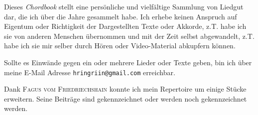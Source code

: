 \documentclass[landscape]{../TeX/Chordbook/chordbook}
\newcommand{\blankpage}{%
    \null
    \thispagestyle{empty}%
    \addtocounter{page}{-1}%
    \newpage}
\newcommand{\wpage}{\afterpage{\blankpage}}
\begin{document}

\date{\textbf{Erstellt am:} 10. Februar 2014 \\ \textbf{\"{U}berarbeitet am:} \today}
\clearpage


\maketitle \clearpage

\begin{center}
    { \Large
        \parbox{17cm}{
            Dieses \textit{Chordbook} stellt eine pers\"{o}nliche und vielf\"{a}ltige Sammlung von Liedgut dar, die ich \"{u}ber die Jahre gesammelt habe.
            Ich erhebe keinen Anspruch auf Eigentum oder Richtigkeit der Dargestellten Texte oder Akkorde, z.T. habe ich sie von anderen Menschen \"{u}bernommen und mit der Zeit selbst abgewandelt, z.T. habe ich sie mir selber durch H\"{o}ren oder Video-Material abkupfern k\"{o}nnen. \par\medskip

            Sollte es Einw\"{a}nde gegen ein oder mehrere Lieder oder Texte geben, bin ich \"{u}ber meine E-Mail Adresse \texttt{hringriin@gmail.com} erreichbar. \par\medskip

            Dank \textsc{Fagus vom Friedriechshain} konnte ich mein Repertoire um einige St\"{u}cke erweitern.
            Seine Beitr\"{a}ge sind gekennzeichnet oder werden noch gekennzeichnet werden.
        }
    }
\end{center}

\clearpage

\tableofcontents \clearpage

\columnsep=3mm

\renewcommand{\snumbgcolor}{songnr}
\renewcommand{\notebgcolor}{notes}
\renewcommand\printchord[1]{\footnotesize\sffamily\textit{\textcolor{linkcolor}{{#1}}}}


\end{document}
